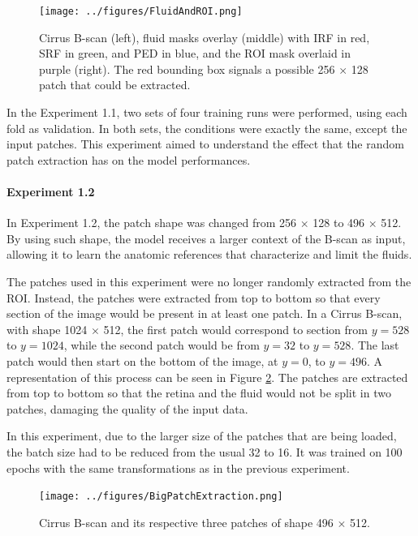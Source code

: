 \begin{figure}[!ht]
	\centering
	\texttt{[image: ../figures/FluidAndROI.png]}
	\caption{Cirrus B-scan (left), fluid masks overlay (middle) with IRF in red, SRF in green, and PED in blue, and the ROI mask overlaid in purple (right). The red bounding box signals a possible 256 $\times$ 128 patch that could be extracted.}
	\label{fig:FluidAndROI}
\end{figure}

\par
In the Experiment 1.1, two sets of four training runs were performed, using each fold as validation. In both sets, the conditions were exactly the same, except the input patches. This experiment aimed to understand the effect that the random patch extraction has on the model performances.

\paragraph{Experiment 1.2}
In Experiment 1.2, the patch shape was changed from 256 $\times$ 128 to 496 $\times$ 512. By using such shape, the model receives a larger context of the B-scan as input, allowing it to learn the anatomic references that characterize and limit the fluids.
\par
The patches used in this experiment were no longer randomly extracted from the ROI. Instead, the patches were extracted from top to bottom so that every section of the image would be present in at least one patch. In a Cirrus B-scan, with shape 1024 $\times$ 512, the first patch would correspond to section from $y=528$ to $y=1024$, while the second patch would be from $y=32$ to $y=528$. The last patch would then start on the bottom of the image, at $y=0$, to $y=496$. A representation of this process can be seen in Figure \ref{fig:BigPatchExtraction}. The patches are extracted from top to bottom so that the retina and the fluid would not be split in two patches, damaging the quality of the input data.
\par
In this experiment, due to the larger size of the patches that are being loaded, the batch size had to be reduced from the usual 32 to 16. It was trained on 100 epochs with the same transformations as in the previous experiment.

\begin{figure}[!ht]
	\centering
	\texttt{[image: ../figures/BigPatchExtraction.png]}
	\caption{Cirrus B-scan and its respective three patches of shape 496 $\times$ 512.}
	\label{fig:BigPatchExtraction}
\end{figure}


